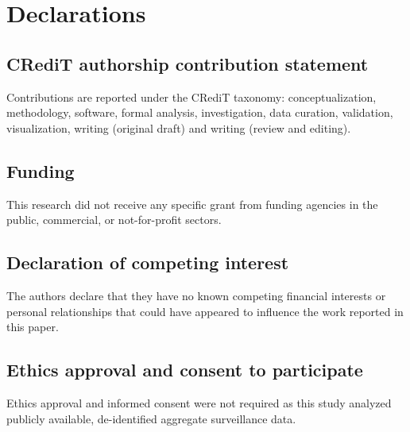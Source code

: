 \section*{Declarations}
\label{sec:declarations}

\subsection*{CRediT authorship contribution statement}
Contributions are reported under the CRediT taxonomy: conceptualization, methodology, software, formal analysis, investigation, data curation, validation, visualization, writing (original draft) and writing (review and editing).

\subsection*{Funding}
This research did not receive any specific grant from funding agencies in the public, commercial, or not-for-profit sectors.

\subsection*{Declaration of competing interest}
The authors declare that they have no known competing financial interests or personal relationships that could have appeared to influence the work reported in this paper.

\subsection*{Ethics approval and consent to participate}
Ethics approval and informed consent were not required as this study analyzed publicly available, de-identified aggregate surveillance data.
